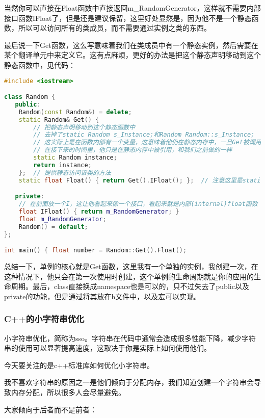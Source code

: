 当然你可以直接在{\ncodestyle Float}函数中直接返回{\ncodestyle m_RandomGenerator}，这样就不需要内部接口函数{\ncodestyle IFloat}了，但是还是建议保留，这里好处显然是，因为他不是一个静态函数，所以可以访问所有的类成员，而不需要通过实例之类的东西。

最后说一下{\ncodestyle Get}函数，这么写意味着我们在类成员中有一个静态实例，然后需要在某个翻译单元中来定义它。这有点麻烦，更好的办法是把这个静态声明移动到这个静态函数中，见代码：

\begin{lstlisting}[language=c++]
#include <iostream>

class Random {
   public:
    Random(const Random&) = delete;
    static Random& Get() {
        // 把静态声明移动到这个静态函数中
        // 去掉了static Random s_Instance;和Random Random::s_Instance;
        // 这实际上是在函数内部有一个变量，这意味着他仍在静态内存中，一旦Get被调用，他将被实例化
        // 在接下来的时间里，他只是在静态内存中被引用，和我们之前做的一样
        static Random instance;
        return instance;
    };  // 提供静态访问该类的方法
    static float Float() { return Get().IFloat(); };  // 注意这里是static函数

   private:
    // 在前面放一个I，这让他看起来像一个接口，看起来就是内部(internal)float函数
    float IFloat() { return m_RandomGenerator; }
    float m_RandomGenerator;
    Random() = default;
};

int main() { float number = Random::Get().Float(); 
\end{lstlisting}

总结一下，单例的核心就是Get函数，这里我有一个单独的实例，我创建一次，在这种情况下，他只会在第一次使用时创建，这个单例的生命周期就是你的应用的生命周期。最后，class直接换成namespace也是可以的，只不过失去了public以及private的功能，但是通过将其放在h文件中，以及宏可以实现。


\subsubsection{C++的小字符串优化}

小字符串优化，简称为sso。字符串在代码中通常会造成很多性能下降，减少字符串的使用可以显著提高速度，这取决于你是实际上如何使用他们。

今天要关注的是c++标准库如何优化小字符串。

我不喜欢字符串的原因之一是他们倾向于分配内存，我们知道创建一个字符串会导致内存分配，所以很多人会尽量避免。

大家倾向于后者而不是前者：


